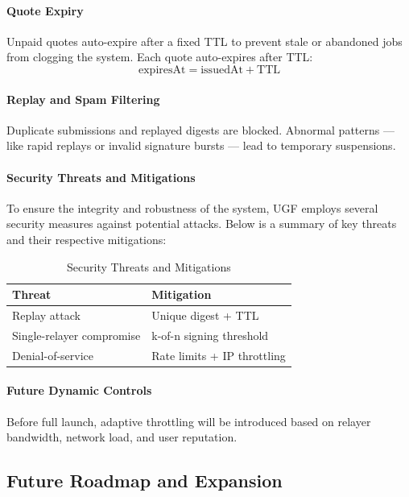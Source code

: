 \documentclass{article}
\begin{document}
\paragraph{Quote Expiry}
Unpaid quotes auto-expire after a fixed TTL to prevent stale or abandoned jobs from clogging the system. Each quote auto-expires after TTL:
\[
  \mathrm{expiresAt} = \mathrm{issuedAt} + \mathrm{TTL}
\]

\paragraph{Replay and Spam Filtering}
Duplicate submissions and replayed digests are blocked. Abnormal patterns — like rapid replays or invalid signature bursts — lead to temporary suspensions.

\paragraph{Security Threats and Mitigations}
To ensure the integrity and robustness of the system, UGF employs several security measures against potential attacks. Below is a summary of key threats and their respective mitigations:

\begin{table}[h!]
\centering
\begin{tabular}{|l|l|}
\hline
\textbf{Threat}            & \textbf{Mitigation}                        \\ \hline
Replay attack             & Unique digest + TTL                       \\ \hline
Single-relayer compromise & k-of-n signing threshold                  \\ \hline
Denial-of-service         & Rate limits + IP throttling               \\ \hline
\end{tabular}
\caption{Security Threats and Mitigations}
\end{table}

\paragraph{Future Dynamic Controls}
Before full launch, adaptive throttling will be introduced based on relayer bandwidth, network load, and user reputation.


\subsection{Future Roadmap and Expansion}
\end{document}

